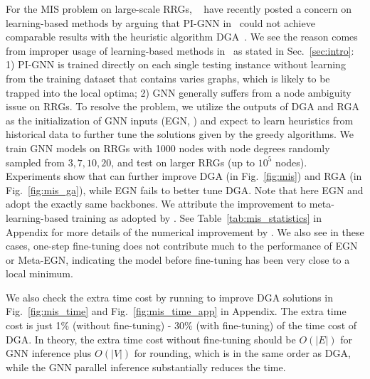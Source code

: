 For the MIS problem on large-scale RRGs, ~\cite{angelini2022cracking} have recently posted a concern on learning-based methods by arguing that PI-GNN in~\cite{schuetz2022combinatorial} could not achieve comparable results with the heuristic algorithm DGA~\citep{angelini2019monte}. We see the reason comes from improper usage of learning-based methods in~\cite{schuetz2022combinatorial} as stated in Sec.~\ref{sec:intro}: 1) PI-GNN is trained directly on each single testing instance without learning from the training dataset that contains varies graphs, which is likely to be trapped into the local optima; 2) GNN generally suffers from a node ambiguity issue on RRGs. To resolve the problem, we utilize the outputs of DGA and RGA as the initialization of GNN inputs (EGN, \proj) and expect to learn heuristics from historical data to further tune the solutions given by the greedy algorithms. We train GNN models on RRGs with 1000 nodes with node degrees randomly sampled from $3,7,10,20$, and test on larger RRGs (up to $10^5$ nodes). %
Experiments show that \proj can further improve DGA (in Fig.~\ref{fig:mis}) and RGA (in Fig.~\ref{fig:mis_ga}), while EGN fails to better tune DGA. Note that here EGN and \proj adopt the exactly same backbones. We attribute the improvement to meta-learning-based training as adopted by \proj. See Table~\ref{tab:mis_statistics} in Appendix for more details of the numerical improvement by \proj. We also see in these cases, one-step fine-tuning does not contribute much to the performance of EGN or Meta-EGN, %
indicating the model before fine-tuning has been very close to a local minimum.

We also check the extra time cost by running \proj to improve DGA solutions in Fig.~\ref{fig:mis_time} and Fig.~\ref{fig:mis_time_app} in Appendix. The extra time cost is just 1\% (without fine-tuning) - 30\% (with fine-tuning) of the time cost of DGA. In theory, the extra time cost without fine-tuning should be $O(|E|)$ for GNN inference plus $O(|V|)$ for rounding, which is in the same order as DGA, while the GNN parallel inference substantially reduces the time.      


